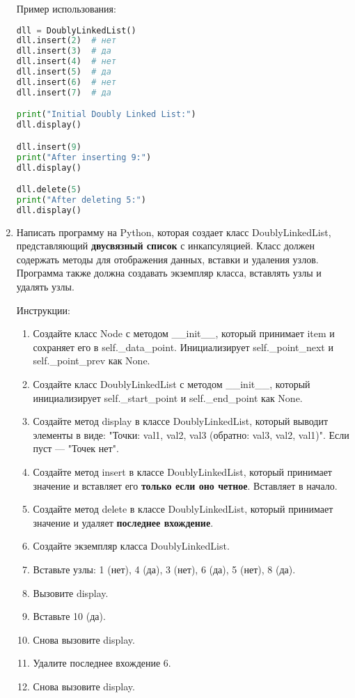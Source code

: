 \begin{enumerate}
Пример использования:
\begin{lstlisting}[language=Python]
dll = DoublyLinkedList()
dll.insert(2)  # нет
dll.insert(3)  # да
dll.insert(4)  # нет
dll.insert(5)  # да
dll.insert(6)  # нет
dll.insert(7)  # да

print("Initial Doubly Linked List:")
dll.display()

dll.insert(9)
print("After inserting 9:")
dll.display()

dll.delete(5)
print("After deleting 5:")
dll.display()
\end{lstlisting}

\item Написать программу на Python, которая создает класс DoublyLinkedList, представляющий \textbf{двусвязный список} с инкапсуляцией. Класс должен содержать методы для отображения данных, вставки и удаления узлов. Программа также должна создавать экземпляр класса, вставлять узлы и удалять узлы.

Инструкции:
\begin{enumerate}
    \item Создайте класс Node с методом \_\_init\_\_, который принимает item и сохраняет его в self.\_data\_point. Инициализирует self.\_point\_next и self.\_point\_prev как None.
    \item Создайте класс DoublyLinkedList с методом \_\_init\_\_, который инициализирует self.\_start\_point и self.\_end\_point как None.
    \item Создайте метод display в классе DoublyLinkedList, который выводит элементы в виде: "Точки: val1, val2, val3 (обратно: val3, val2, val1)". Если пуст — "Точек нет".
    \item Создайте метод insert в классе DoublyLinkedList, который принимает значение и вставляет его \textbf{только если оно четное}. Вставляет в начало.
    \item Создайте метод delete в классе DoublyLinkedList, который принимает значение и удаляет \textbf{последнее вхождение}.
    \item Создайте экземпляр класса DoublyLinkedList.
    \item Вставьте узлы: 1 (нет), 4 (да), 3 (нет), 6 (да), 5 (нет), 8 (да).
    \item Вызовите display.
    \item Вставьте 10 (да).
    \item Снова вызовите display.
    \item Удалите последнее вхождение 6.
    \item Снова вызовите display.
\end{enumerate}


\end{enumerate}
